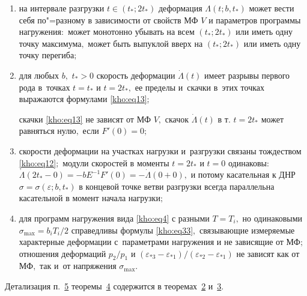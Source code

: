 \begin{theorem}[4]
\begin{enumerate}
\hypertarget{kh:th4:p5}{} 



\item[\rm 5)] на интервале разгрузки $t\in(t_\ast;2t_\ast)$ деформация $\Lambda(t;b,t_\ast)$ может вести себя по"=разному в зависимости от свойств МФ $V$ и параметров программы нагружения\/$:$ может монотонно убывать на всем $(t_\ast;2t_\ast)$ или иметь одну точку максимума$,$ может быть выпуклой вверх на $(t_\ast;2t_\ast)$ или иметь одну точку перегиба\/$;$ 



\item[\rm 6)] для любых $b,$ $t_\ast>0$ скорость деформации $\dot{\Lambda}(t)$ имеет разрывы первого рода в~точках $t=t_\ast$ и $t=2t_\ast,$ ее пределы и~скачки в~этих точках выражаются формулами \eqref{kho:eq13}$;$ 

скачки \eqref{kho:eq13} не зависят от МФ $V,$ скачок $\dot{\Lambda}(t)$ в т$.$ $t=2t_\ast$ может равняться нулю$,$ если $F'(0)=0;$



\item[\rm 7)] скорости деформации на участках нагрузки и~разгрузки связаны тождеством \eqref{kho:eq12}$;$ модули скоростей в моменты $t=2t_\ast$ и $t=0$ одинаковы\/$:$ $\dot{\Lambda}(2t_\ast-0)=-bE^{-1}F'(0)=-\dot{\Lambda}(0+0),$ и потому касательная к ДНР $\sigma=\sigma(\varepsilon;b,t_\ast)$ в концевой точке ветви разгрузки всегда параллельна касательной в момент начала нагрузки\/$;$



\item[\rm 8)]  для программ нагружения вида \eqref{kho:eq4} с разными $T=T_i,$ но одинаковыми $\sigma_{\max}=b_iT_i/2$ справедливы формулы \eqref{kho:eq33}$,$ связывающие измеряемые характерные деформации с~параметрами нагружения и не зависящие от МФ\/$;$ отношения деформаций $p_2/p_1$ и $(\varepsilon_{\ast3}-\varepsilon_{\ast1})/(\varepsilon_{\ast2}-\varepsilon_{\ast1})$ не зависят как от МФ$,$ так и~от напряжения $\sigma_{\max}.$

\end{enumerate}

\end{theorem}



\smallskip



Детализация п.~\hyperlink{kh:th4:p5}{5} теоремы~\hyperlink{kh:th4}{4} содержится в теоремах~\hyperlink{kh:th2}{2}  и~\hyperlink{kh:th3}{3}.



